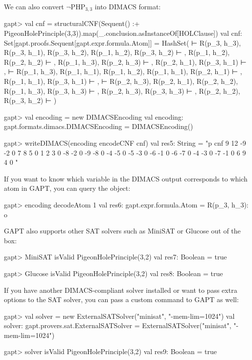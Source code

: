 \documentclass[a4paper,11pt]{book}
\newcommand{\cli}[1]{{\ttfamily {#1}}}
\begin{document}
We can also convert $\neg\mathrm{PHP}_{3,3}$ into DIMACS format:
\begin{clilisting}
gapt> val cnf = structuralCNF(Sequent() :+ PigeonHolePrinciple(3,3)).map(_.conclusion.asInstanceOf[HOLClause])
val cnf: Set[gapt.proofs.Sequent[gapt.expr.formula.Atom]] = HashSet( ⊢ R(p_3, h_3), R(p_3, h_1), R(p_3, h_2), R(p_1, h_2), R(p_3, h_2) ⊢ , R(p_1, h_2), R(p_2, h_2) ⊢ , R(p_1, h_3), R(p_2, h_3) ⊢ , R(p_2, h_1), R(p_3, h_1) ⊢ ,  ⊢ R(p_1, h_3), R(p_1, h_1), R(p_1, h_2), R(p_1, h_1), R(p_2, h_1) ⊢ , R(p_1, h_1), R(p_3, h_1) ⊢ ,  ⊢ R(p_2, h_3), R(p_2, h_1), R(p_2, h_2), R(p_1, h_3), R(p_3, h_3) ⊢ , R(p_2, h_3), R(p_3, h_3) ⊢ , R(p_2, h_2), R(p_3, h_2) ⊢ )

gapt> val encoding = new DIMACSEncoding
val encoding: gapt.formats.dimacs.DIMACSEncoding = DIMACSEncoding()

gapt> writeDIMACS(encoding encodeCNF cnf)
val res5: String = "p cnf 9 12
-9 -2 0
7 8 5 0
1 2 3 0
-8 -2 0
-9 -8 0
-4 -5 0
-5 -3 0
-6 -1 0
-6 -7 0
-4 -3 0
-7 -1 0
6 9 4 0
"

\end{clilisting}

If you want to know which variable in the DIMACS output corresponds to which
atom in GAPT, you can query the \cli{DIMACSEncoding} object:
\begin{clilisting}
gapt> encoding decodeAtom 1
val res6: gapt.expr.formula.Atom = R(p_3, h_3): o

\end{clilisting}

GAPT also supports other SAT solvers such as MiniSAT or Glucose out of the box:
\begin{clilisting}
gapt> MiniSAT isValid PigeonHolePrinciple(3,2)
  val res7: Boolean = true

\end{clilisting}
\begin{clilisting}
gapt> Glucose isValid PigeonHolePrinciple(3,2)
  val res8: Boolean = true

\end{clilisting}

If you have another DIMACS-compliant solver installed or want to pass extra
options to the SAT solver, you can pass a custom command to GAPT as well:
\begin{clilisting}
gapt> val solver = new ExternalSATSolver("minisat", "-mem-lim=1024")
  val solver: gapt.provers.sat.ExternalSATSolver = ExternalSATSolver("minisat", "-mem-lim=1024")

gapt> solver isValid PigeonHolePrinciple(3,2)
  val res9: Boolean = true

\end{clilisting}
\end{document}
